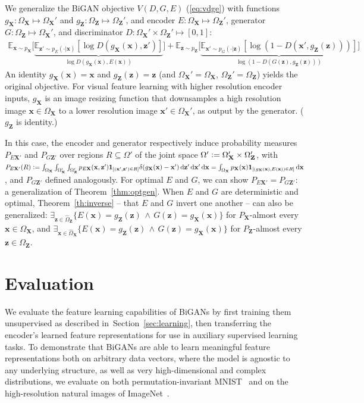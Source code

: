\documentclass{article}
\newcommand{\expect}[2]{\mathbb{E}_{#1}\left[#2\right]}
\newcommand{\ldeltafunc}[1]{\mathbf{1}_{\left[#1\right]}}
\newcommand{\logp}[1]{\log\left(#1\right)}
\newcommand{\defeq}{\vcentcolon=}
\renewcommand{\d}{\mathop{}\!\mathrm{d}}
\def\smallint{\begingroup\textstyle \int\endgroup}
\renewcommand{\vec}[1]{\mathbf{#1}}
\newcommand{\x}{\vec{x}}
\newcommand{\X}{\vec{X}}
\newcommand{\OX}{\Omega_\X}
\newcommand{\hOX}{\hat{\Omega}_\X}
\newcommand{\z}{\vec{z}}
\newcommand{\Z}{\vec{Z}}
\newcommand{\OZ}{\Omega_\Z}
\newcommand{\hOZ}{\hat{\Omega}_\Z}
\newcommand{\refsec}[1]{Section~\ref{sec:#1}}
\newcommand{\lblsec}[1]{\label{sec:#1}}
\begin{document}
We generalize the BiGAN objective $V(D, G, E)$ (\ref{eq:vdge}) with functions $g_\X : \OX \mapsto \OX'$ and $g_\Z : \OZ \mapsto \OZ'$, and encoder $E: \OX \mapsto \OZ'$, generator $G: \OZ \mapsto \OX'$, and discriminator $D: \OX' \times \OZ' \mapsto [0, 1]$:
\begin{align*}
\mathbb{E}_{\x \sim p_\X}\big[
  \underbrace{
    \expect{\z' \sim p_E(\cdot | \x)}{
      \log D(g_\X(\x), \z')
    }
  }_{
    \log D(g_\X(\x), E(\x))
  }
\big]
+
\mathbb{E}_{\z \sim p_\Z}\big[
  \underbrace{
    \expect{\x' \sim p_G(\cdot | \z)}{
      \logp{1 - D(\x', g_\Z(\z))}
    }
  }_{
    \logp{1 - D(G(\z), g_\Z(\z))}
  }
\big]
\end{align*}
An identity $g_\X(\x)=\x$ and $g_\Z(\z)=\z$ (and $\OX'=\OX$, $\OZ'=\OZ$) yields the original objective.
For visual feature learning with higher resolution encoder inputs, $g_\X$ is an image resizing function that downsamples a high resolution image $\x \in \OX$ to a lower resolution image $\x' \in \OX'$, as output by the generator.  ($g_\Z$ is identity.)

In this case, the encoder and generator respectively induce probability measures $P_{E\X'}$ and $P_{G\Z'}$ over regions $R\subseteq\Omega'$ of the joint space $\Omega' \defeq \OX' \times \OZ'$, with $
P_{E\X'}(R) \defeq \smallint_{\OX} \smallint_{\OX'} \smallint_{\OZ'} p_{E\X}(\x, \z') \ldeltafunc{(\x', \z') \in R} \delta(g_\X(\x) - \x') \d\z' \d\x' \d\x
=
\smallint_{\OX} p_\X(\x) \ldeltafunc{(g_\X(\x), E(\x)) \in R} \d\x
$, and $P_{G\Z'}$ defined analogously.
For optimal $E$ and $G$, we can show $P_{E\X'} = P_{G\Z'}$: a generalization of Theorem~\ref{thm:optgen}.
When $E$ and $G$ are deterministic and optimal, Theorem~\ref{th:inverse} -- that $E$ and $G$ invert one another -- can also be generalized:
$\exists_{\z \in \hOZ} \{ E(\x) = g_\Z(\z) \,\land\, G(\z) = g_\X(\x) \}$ for $P_\X$-almost every $\x \in \OX$, and
$\exists_{\x \in \hOX} \{ E(\x) = g_\Z(\z) \,\land\, G(\z) = g_\X(\x) \}$ for $P_\Z$-almost every $\z \in \OZ$.

\section{Evaluation}
\lblsec{eval}

We evaluate the feature learning capabilities of BiGANs by first training them unsupervised as described in~\refsec{learning},
then transferring the encoder's learned feature representations for use in auxiliary supervised learning tasks.
To demonstrate that BiGANs are able to learn meaningful feature representations both on arbitrary data vectors,
where the model is agnostic to any underlying structure,
as well as very high-dimensional and complex distributions,
we evaluate on both permutation-invariant MNIST~\citep{mnist}
and on the high-resolution natural images of ImageNet~\citep{imagenet}.
\end{document}
